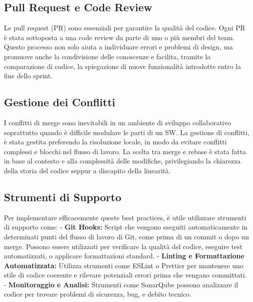 
\subsection{Pull Request e Code Review}

Le pull request (PR) sono essenziali per garantire la qualità del codice. Ogni PR è stata sottoposta a una code review da parte di uno o più membri del team. 
Questo processo non solo aiuta a individuare errori e problemi di design, ma promuove anche la condivisione delle conoscenze e facilita, tramite la 
comparazione di codice, la spiegazione di nuove funzionalità introdotte entro la fine dello sprint.


\subsection{Gestione dei Conflitti}

I conflitti di merge sono inevitabili in un ambiente di sviluppo collaborativo soprattutto quando è difficile modulare le parti di un SW.
La gestione di conflitti, è stata gestita preferendo la risoluzione locale, in modo da evitare conflitti complessi e blocchi nel flusso di lavoro.
La scelta tra merge e rebase è stata fatta in base al contesto e alla complessità delle modifiche, privilegiando la chiarezza della storia del codice seppur a discapito della linearità.


\subsection{Strumenti di Supporto} %

Per implementare efficacemente queste best practices, è utile utilizzare strumenti di supporto come:
- \textbf{Git Hooks:} Script che vengono eseguiti automaticamente in determinati punti del flusso di lavoro di Git, come prima di un commit o dopo un merge. Possono essere utilizzati per verificare la qualità del codice, eseguire test automatizzati, o applicare formattazioni standard.
- \textbf{Linting e Formattazione Automatizzata:} Utilizza strumenti come ESLint o Prettier per mantenere uno stile di codice coerente e rilevare potenziali errori prima che vengano committati.
- \textbf{Monitoraggio e Analisi:} Strumenti come SonarQube possono analizzare il codice per trovare problemi di sicurezza, bug, e debito tecnico.

